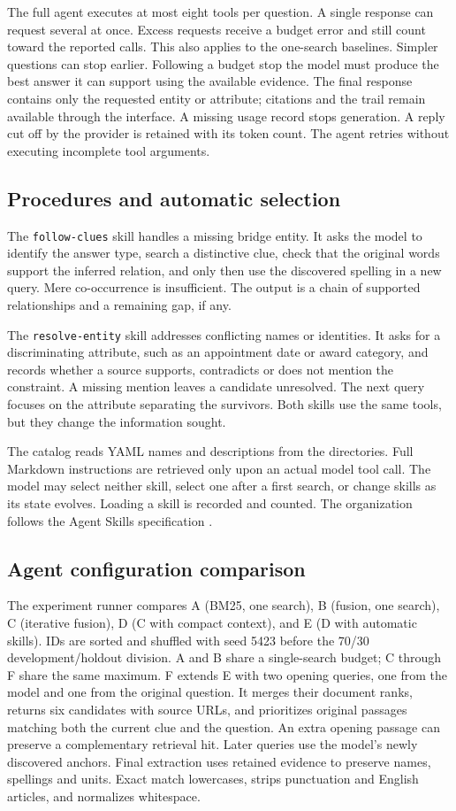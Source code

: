 \documentclass[sigconf]{acmart}
\begin{document}
The full agent executes at most eight tools per question. A single response can request several at once. Excess requests receive a budget error and still count toward the reported calls. This also applies to the one-search baselines. Simpler questions can stop earlier. Following a budget stop the model must produce the best answer it can support using the available evidence. The final response contains only the requested entity or attribute; citations and the trail remain available through the interface. A missing usage record stops generation. A reply cut off by the provider is retained with its token count. The agent retries without executing incomplete tool arguments.
\subsection{Procedures and automatic selection}
The \texttt{follow-clues} skill handles a missing bridge entity. It asks the model to identify the answer type, search a distinctive clue, check that the original words support the inferred relation, and only then use the discovered spelling in a new query. Mere co-occurrence is insufficient. The output is a chain of supported relationships and a remaining gap, if any.

The \texttt{resolve-entity} skill addresses conflicting names or identities. It asks for a discriminating attribute, such as an appointment date or award category, and records whether a source supports, contradicts or does not mention the constraint. A missing mention leaves a candidate unresolved. The next query focuses on the attribute separating the survivors. Both skills use the same tools, but they change the information sought.

The catalog reads YAML names and descriptions from the directories. Full Markdown instructions are retrieved only upon an actual model tool call. The model may select neither skill, select one after a first search, or change skills as its state evolves. Loading a skill is recorded and counted. The organization follows the Agent Skills specification \cite{skills}. \SkillObservations
\subsection{Agent configuration comparison}
The experiment runner compares A (BM25, one search), B (fusion, one search), C (iterative fusion), D (C with compact context), and E (D with automatic skills). IDs are sorted and shuffled with seed 5423 before the 70/30 development/holdout division. A and B share a single-search budget; C through F share the same maximum. F extends E with two opening queries, one from the model and one from the original question. It merges their document ranks, returns six candidates with source URLs, and prioritizes original passages matching both the current clue and the question. An extra opening passage can preserve a complementary retrieval hit. Later queries use the model's newly discovered anchors. Final extraction uses retained evidence to preserve names, spellings and units. Exact match lowercases, strips punctuation and English articles, and normalizes whitespace. \AgentMetrics
\clearpage
\end{document}
